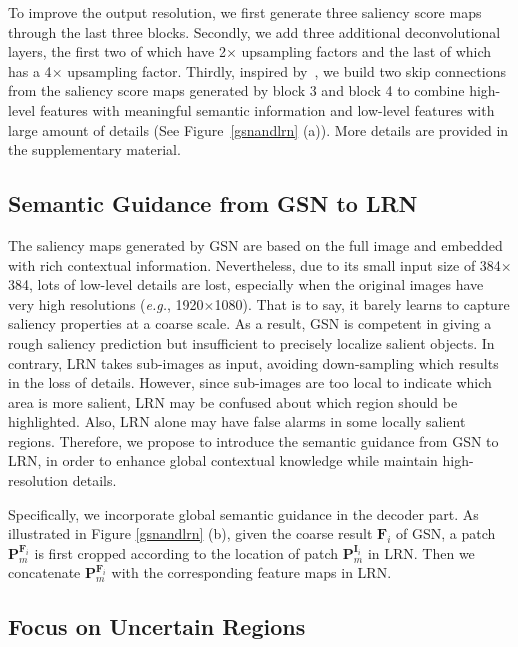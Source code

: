 To improve the output resolution, we first generate three saliency score maps through the last three blocks. Secondly, we add three additional deconvolutional layers, the first two of which have 2{$\times$} upsampling factors and the last of which has a 4{$\times$} upsampling factor. Thirdly, inspired by~\cite{long2015fully}, we build two skip connections from the saliency score maps generated by block 3 and block 4 to combine high-level features with meaningful semantic information and low-level features with large amount of details (See Figure~\ref{gsnandlrn} (a)). More details are provided in the supplementary material.

\subsection{Semantic Guidance from GSN to LRN} \label{42}

The saliency maps generated by GSN are based on the full image and embedded with rich contextual information. Nevertheless, due to its small input size of 384{$\times$}384, lots of low-level details are lost, especially when the original images have very high resolutions (\emph{e.g.}, 1920{$\times$}1080). That is to say, it barely learns to capture saliency properties at a coarse scale. As a result, GSN is competent in giving a rough saliency prediction but insufficient to precisely localize salient objects. In contrary, LRN takes sub-images as input, avoiding down-sampling which results in the loss of details. However, since sub-images are too local to indicate which area is more salient, LRN may be confused about which region should be highlighted. Also, LRN alone may have false alarms in some locally salient regions. Therefore, we propose to introduce the semantic guidance from GSN to LRN, in order to enhance global contextual knowledge while maintain high-resolution details.

Specifically, we incorporate global semantic guidance in the decoder part. As illustrated in Figure \ref{gsnandlrn} (b), given the coarse result $\bm{F}_i$ of GSN, a patch $\bm{P}_m^{\bm{F}_i}$ is first cropped according to the location of patch $\bm{P}_m^{\bm{I}_i}$ in LRN. Then we concatenate $\bm{P}_m^{\bm{F}_i}$ with the corresponding feature maps in LRN.

\subsection{Focus on Uncertain Regions}

